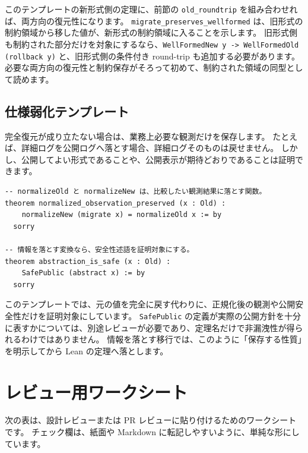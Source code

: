 このテンプレートの新形式側の定理に、前節の \texttt{old\_roundtrip} を組み合わせれば、両方向の復元性になります。
\texttt{migrate\_preserves\_wellformed} は、旧形式の制約領域から移した値が、新形式の制約領域に入ることを示します。
旧形式側も制約された部分だけを対象にするなら、\texttt{WellFormedNew y -> WellFormedOld (rollback y)} と、旧形式側の条件付き round-trip も追加する必要があります。
必要な両方向の復元性と制約保存がそろって初めて、制約された領域の同型として読めます。

\subsection{仕様弱化テンプレート}

完全復元が成り立たない場合は、業務上必要な観測だけを保存します。
たとえば、詳細ログを公開ログへ落とす場合、詳細ログそのものは戻せません。
しかし、公開してよい形式であることや、公開表示が期待どおりであることは証明できます。

\begin{listing}[htbp]
\begin{verbatim}
-- normalizeOld と normalizeNew は、比較したい観測結果に落とす関数。
theorem normalized_observation_preserved (x : Old) :
    normalizeNew (migrate x) = normalizeOld x := by
  sorry

-- 情報を落とす変換なら、安全性述語を証明対象にする。
theorem abstraction_is_safe (x : Old) :
    SafePublic (abstract x) := by
  sorry
\end{verbatim}
\caption{\texttt{normalized\_observation\_preserved}・\texttt{abstraction\_is\_safe}}
\label{lst:appD_template_weakening}
\end{listing}

このテンプレートでは、元の値を完全に戻す代わりに、正規化後の観測や公開安全性だけを証明対象にしています。
\texttt{SafePublic} の定義が実際の公開方針を十分に表すかについては、別途レビューが必要であり、定理名だけで非漏洩性が得られるわけではありません。
情報を落とす移行では、このように「保存する性質」を明示してから Lean の定理へ落とします。

\section{レビュー用ワークシート}

次の表は、設計レビューまたは PR レビューに貼り付けるためのワークシートです。
チェック欄は、紙面や Markdown に転記しやすいように、単純な形にしています。

